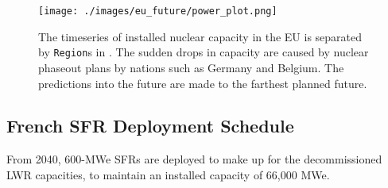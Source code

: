 \begin{figure}[htbp!]
    \begin{center}
        \texttt{[image: ./images/eu\_future/power\_plot.png]}
    \end{center}
    \caption{The timeseries of installed nuclear capacity in the EU is separated by \texttt{Region}s in \Cyclus.
             The sudden drops in capacity are caused by nuclear phaseout plans by nations such as Germany and Belgium.
             The predictions into the future are made to the farthest planned future.
             }
    \label{fig:eu_pow}
\end{figure}



\subsection{French \gls{SFR} Deployment Schedule}

From 2040,
600-\gls{MWe} \glspl{SFR} are deployed to make up for the 
decommissioned \gls{LWR} capacities, to maintain an installed 
capacity of 66,000 \gls{MWe}. 

